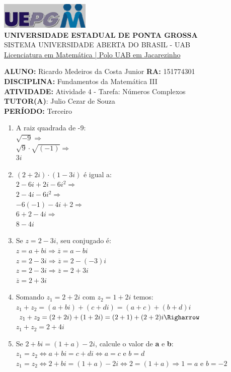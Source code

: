 \documentclass[a4paper, 12pt]{article}
\begin{document}
\begin{flushleft}\includegraphics{logo}\\
\textbf{UNIVERSIDADE ESTADUAL DE PONTA GROSSA} \\
SISTEMA UNIVERSIDADE ABERTA DO BRASIL - UAB \\
\underline{Licenciatura em Matemática | Polo UAB em Jacarezinho}\end{flushleft} 
\textbf{ALUNO:} Ricardo Medeiros da Costa Junior   \textbf{RA:} 151774301 \\
\textbf{DISCIPLINA:} Fundamentos da Matemática III \\
\textbf{ATIVIDADE:} Atividade 4 - Tarefa: Números Complexos\\
\textbf{TUTOR(A)}: Julio Cezar de Souza\\
\textbf{PERÍODO:} Terceiro\\
\begin{enumerate}
\item A raiz quadrada de -9:\\
  $\sqrt{-9} \Rightarrow$\\
  $\sqrt{9}\cdot\sqrt{(-1)} \Rightarrow$\\
  $3i$
\item $(2+2i)\cdot(1-3i)$ é igual a:\\
  $2-6i+2i-6i^2 \Rightarrow$\\
  $2-4i-6i^2 \Rightarrow$\\
  $-6(-1)-4i+2 \Rightarrow$\\
  $6+2-4i \Rightarrow$\\
  $8-4i$
\item Se $z = 2-3i$, seu conjugado é:\\
  $z = a + bi \Rightarrow \overline{z} = a - bi$\\
  $z = 2 - 3i \Rightarrow \overline{z} = 2 - (-3)i$\\
  $z = 2 - 3i \Rightarrow \overline{z} = 2 + 3i$\\
  $\overline{z} = 2 + 3i$
\item Somando $z_1 = 2 + 2i$ com $z_2 = 1 + 2i$ temos:\\
  $z_1 + z_2 = (a + bi) + (c + di) = (a + c) + (b + d)i$\\
  $z_1 + z_2 = (2 + 2i) + (1 + 2i) = (2 + 1) + (2 + 2)i \Righarrow$\\
  $z_1 + z_2 = 2 + 4i$
\item Se $2 + bi = (1 + a) - 2i$, calcule o valor de \textbf{a} e \textbf{b}:\\
  $z_1 = z_2 \Leftrightarrow a + bi = c + di \Leftrightarrow a = c$ e $b = d$\\
  $z_1 = z_2 \Leftrightarrow 2 + bi = (1 + a) - 2i \Leftrightarrow 2 = (1 + a) \Rightarrow 1 = a$ e $b = -2$  
\end{enumerate}
\end{document}
